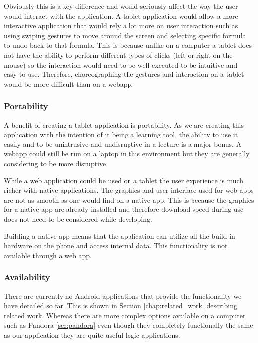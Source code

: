 \documentclass{report}
\begin{document}
Obviously this is a key difference and would seriously affect the way the user would interact with the application. A tablet application would allow a more interactive application that would rely a lot more on user interaction such as using swiping gestures to move around the screen and selecting specific formula to undo back to that formula. This is because unlike on a computer a tablet does not have the ability to perform different types of clicks (left or right on the mouse) so the interaction would need to be well executed to be intuitive and easy-to-use. Therefore, choreographing the gestures and interaction on a tablet would be more difficult than on a webapp. 

\subsubsection{Portability}

A benefit of creating a tablet application is portability. As we are creating this application with the intention of it being a learning tool, the ability to use it easily and to be unintrusive and undisruptive in a lecture is a major bonus. A webapp could still be run on a laptop in this environment but they are generally considering to be more disruptive.

While a web application could be used on a tablet the user experience is much richer with native applications. The graphics and user interface used for web apps are not as smooth as one would find on a native app. This is because the graphics for a native app are already installed and therefore download speed during use does not need to be considered while developing\cite{androidwebappdifferences}.

Building a native app means that the application can utilize all the build in hardware on the phone and access internal data. This functionality is not available through a web app.

\subsubsection{Availability}

There are currently no Android applications that provide the functionality we have detailed so far. This is shown in Section \ref{chap:related_work} describing related work. Whereas there are more complex options available on a computer such as Pandora \ref{sec:pandora} even though they completely functionally the same as our application they are quite useful logic applications. 
\end{document}
